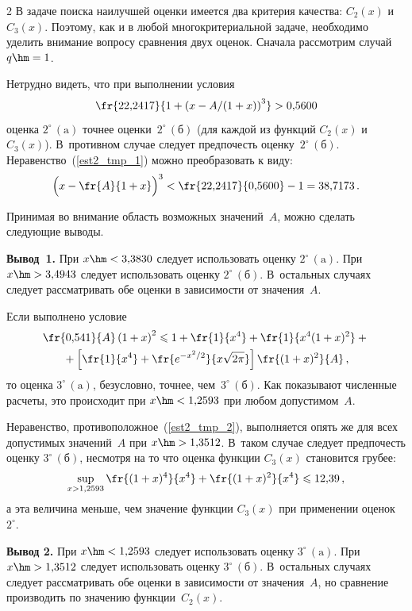 \begin{multicols}{2}
В задаче поиска наилучшей оценки имеется два критерия качества:
$C_2(x)$ и $C_3(x)$. Поэтому, как и в любой многокритериальной
задаче, необходимо уделить внимание вопросу сравнения двух оценок.
Сначала рассмотрим случай $q\hm=1$.

Нетрудно видеть, что при выполнении условия
\begin{equation} 
\label{est2_tmp_1}
\fr{22{,}2417}{1+\left(x-{A}/(1+x)\right)^3}>0{,}5600
\end{equation}
оценка $2^{\circ}\,(\mathrm{a})$ точнее оценки~$2^{\circ}\,(\mathrm{б})$ (для каждой
из функций $C_2(x)$ и~$C_3(x)$). В~противном случае следует
предпочесть оценку~$2^{\circ}\,(\mathrm{б})$. Неравенство~(\ref{est2_tmp_1}) можно преобразовать к виду:
$$
\Big(x-\fr{A}{1+x}\Big)^3<\fr{22{,}2417}{0{,}5600}-1=38{,}7173\,.
$$

Принимая во внимание область возможных значений~$A$, можно сделать
следующие выводы.

\medskip

\noindent
\textbf{Вывод~1.}
При $x\hm<3{,}3830$ следует использовать оценку $2^{\circ}\,(\mathrm{a})$. При
$x\hm>3{,}4943$ следует использовать оценку $2^{\circ}\,(\mathrm{б})$. 
В~остальных случаях следует рас\-смат\-ри\-вать обе оценки в зависимости
от значения~$A$.

\smallskip

Если выполнено условие
\begin{multline} 
\label{est2_tmp_2}
\fr{0{,}541}{A} \left(1+x\right)^2\leqslant 1+\fr{1}{x^4}+\fr{1}{x^4(1+x)^2}+{}\\
{}+
\left[\fr{1}{x^4}+\fr{e^{-x^2/2}}{x\sqrt{2\pi}}\right]\fr{(1+x)^2}{A}\,,
\end{multline}
то оценка $3^{\circ}\,(\mathrm{a})$, безусловно, точнее, чем~$3^{\circ}\,(\mathrm{б})$. 
Как показывают численные расчеты, это происходит
при $x\hm<1{,}2593$ при любом допустимом~$A$.

Неравенство, противоположное~(\ref{est2_tmp_2}), выполняется опять
же для всех допустимых значений~$A$ при $x\hm>1{,}3512$. В~таком случае
следует предпочесть оценку $3^{\circ}\,(\mathrm{б})$, несмотря на то что
оценка функции $C_3(x)$ становится грубее:
$$
\sup\limits_{x>1{,}2593}\fr{(1+x)^4}{x^4}+\fr{(1+x)^2}{x^4}\leqslant 12{,}39\,,
$$
а эта величина меньше, чем значение функции $C_3(x)$ при
применении оценок~$2^\circ$.

\medskip

\noindent
\textbf{Вывод 2.}
При $x\hm<1{,}2593$ следует использовать оценку $3^{\circ}\,(\mathrm{a})$. При
$x\hm>1{,}3512$ следует использовать оценку $3^{\circ}\,(\mathrm{б})$. 
В~остальных случаях следует рассматривать обе оценки в зависимости
от значения~$A$, но сравнение производить по значению функции~$C_2(x)$.


\end{multicols}
